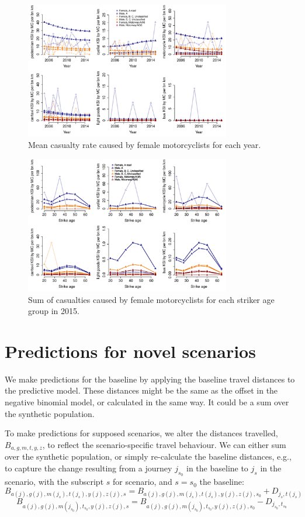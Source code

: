 \documentclass{article}
\begin{document}
\begin{figure}[H]
\centering
\includegraphics[width=0.8\textwidth]{pred6yearMC.pdf}
\caption{\small Mean casualty rate caused by female motorcyclists for each year.}
\label{pred6yearMC}
\end{figure}

\begin{figure}[H]
\centering
\includegraphics[width=0.8\textwidth]{pred6Age2015MC.pdf}
\caption{\small Sum of casualties caused by female motorcyclists for each striker age group in 2015.}
\label{pred6Age2015MC}
\end{figure}

\section{Predictions for novel scenarios}

We make predictions for the baseline by applying the baseline travel distances to the predictive model. These distances might be the same as the offset in the negative binomial model, or calculated in the same way. It could be a sum over the synthetic population.

To make predictions for supposed scenarios, we alter the distances travelled, ${B}_{a,g,m,t,y,z}$, to reflect the scenario-specific travel behaviour. We can either sum over the synthetic population, or simply re-calculate the baseline distances, e.g., to capture the change resulting from a journey $j_{s_0}$ in the baseline to $j_s$ in the scenario, with the subscript $s$ for scenario, and $s=s_0$ the baseline:
$${B}_{a(j),g(j),m(j_s),t(j_s),y(j),z(j),s} = {B}_{a(j),g(j),m(j_s),t(j_s),y(j),z(j),s_0}+D_{j_s,t(j_s)}$$
$$B_{a(j),g(j),m(j_{s_0}),t_{s_0},y(j),z(j),s} = B_{a(j),g(j),m(j_{s_0}),t_{s_0},y(j),z(j),s_0}-D_{j_{s_0},t_{s_0}}$$
\end{document}
